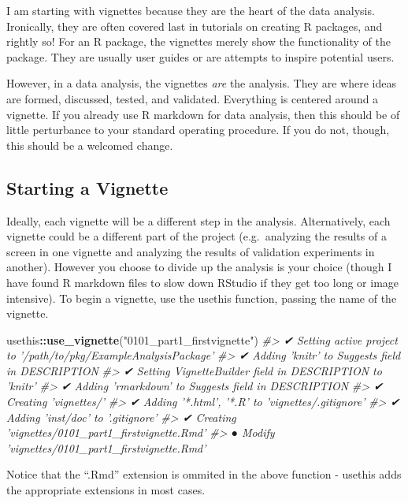 \documentclass[]{book}
\newenvironment{Shaded}{\begin{snugshade}}{\end{snugshade}}
\newcommand{\KeywordTok}[1]{\textcolor[rgb]{0.13,0.29,0.53}{\textbf{#1}}}
\newcommand{\StringTok}[1]{\textcolor[rgb]{0.31,0.60,0.02}{#1}}
\newcommand{\CommentTok}[1]{\textcolor[rgb]{0.56,0.35,0.01}{\textit{#1}}}
\newcommand{\OperatorTok}[1]{\textcolor[rgb]{0.81,0.36,0.00}{\textbf{#1}}}
\newcommand{\NormalTok}[1]{#1}
\begin{document}
I am starting with vignettes because they are the heart of the data
analysis. Ironically, they are often covered last in tutorials on
creating R packages, and rightly so! For an R package, the vignettes
merely show the functionality of the package. They are usually user
guides or are attempts to inspire potential users.

However, in a data analysis, the vignettes \emph{are} the analysis. They
are where ideas are formed, discussed, tested, and validated. Everything
is centered around a vignette. If you already use R markdown for data
analysis, then this should be of little perturbance to your standard
operating procedure. If you do not, though, this should be a welcomed
change.

\subsection{Starting a Vignette}\label{starting-a-vignette}

Ideally, each vignette will be a different step in the analysis.
Alternatively, each vignette could be a different part of the project
(e.g.~analyzing the results of a screen in one vignette and analyzing
the results of validation experiments in another). However you choose to
divide up the analysis is your choice (though I have found R markdown
files to slow down RStudio if they get too long or image intensive). To
begin a vignette, use the usethis function, passing the name of the
vignette.

\begin{Shaded}
\begin{Highlighting}[]
\NormalTok{usethis}\OperatorTok{::}\KeywordTok{use_vignette}\NormalTok{(}\StringTok{"0101_part1_firstvignette"}\NormalTok{)}
\CommentTok{#> ✔ Setting active project to '/path/to/pkg/ExampleAnalysisPackage'}
\CommentTok{#> ✔ Adding 'knitr' to Suggests field in DESCRIPTION}
\CommentTok{#> ✔ Setting VignetteBuilder field in DESCRIPTION to 'knitr'}
\CommentTok{#> ✔ Adding 'rmarkdown' to Suggests field in DESCRIPTION}
\CommentTok{#> ✔ Creating 'vignettes/'}
\CommentTok{#> ✔ Adding '*.html', '*.R' to 'vignettes/.gitignore'}
\CommentTok{#> ✔ Adding 'inst/doc' to '.gitignore'}
\CommentTok{#> ✔ Creating 'vignettes/0101_part1_firstvignette.Rmd'}
\CommentTok{#> ● Modify 'vignettes/0101_part1_firstvignette.Rmd'}
\end{Highlighting}
\end{Shaded}

Notice that the ``.Rmd'' extension is ommited in the above function -
usethis adds the appropriate extensions in most cases.
\end{document}
